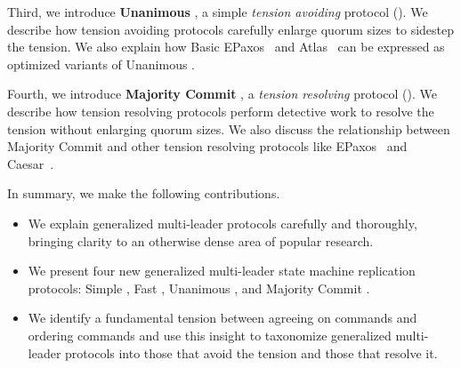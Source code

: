 Third, we introduce \textbf{Unanimous \BPaxos{}}, a simple \emph{tension
avoiding} protocol (). We describe how tension
avoiding protocols carefully enlarge quorum sizes to sidestep the tension. We
also explain how Basic EPaxos~\cite{moraru2013there} and
Atlas~\cite{enes2020state} can be expressed as optimized variants of Unanimous
\BPaxos{}.

Fourth, we introduce \textbf{Majority Commit \BPaxos{}}, a \emph{tension
resolving} protocol (). We describe how tension
resolving protocols perform detective work to resolve the tension without
enlarging quorum sizes.  We also discuss the relationship between Majority
Commit \BPaxos{} and other tension resolving protocols like
EPaxos~\cite{moraru2013proof} and Caesar~\cite{arun2017speeding}.

In summary, we make the following contributions.
\begin{itemize}
  \item
    We explain generalized multi-leader protocols carefully and thoroughly,
    bringing clarity to an otherwise dense area of popular research.

  \item
    We present four new generalized multi-leader state machine replication
    protocols: Simple \BPaxos{}, Fast \BPaxos{}, Unanimous \BPaxos{}, and
    Majority Commit \BPaxos{}.

  \item
    We identify a fundamental tension between agreeing on commands and ordering
    commands and use this insight to taxonomize generalized multi-leader
    protocols into those that avoid the tension and those that resolve it.
\end{itemize}
